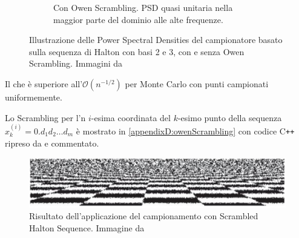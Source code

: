 \begin{figure}[tb]
\begin{subfigure}[t]{0.5\linewidth}
		\caption{Con Owen Scrambling. PSD quasi unitaria nella maggior parte del dominio alle alte frequenze.}
		\label{chapter5:sampling:owen:yes}
	\end{subfigure}
	\caption{Illustrazione delle Power Spectral Densities del campionatore basato sulla sequenza di Halton con basi 2 e 3, con e senza Owen Scrambling.
		Immagini da \cite{pharr}}
	\label{chapter5:sampling:owen}
\end{figure}
Il che \`e superiore all'$\mathcal{O}(n^{-1/2})$ per Monte Carlo con punti campionati uniformemente.\par
Lo Scrambling per l'n $i$-esima coordinata del $k$-esimo punto della sequenza $x_k^{(i)}=0.d_1d_2\ldots d_m$ \`e mostrato in 
\ref{appendixD:owenScrambling} con codice C\texttt{++} ripreso da \cite{pharr} e commentato.
\begin{figure}[b]
	\centering
	\includegraphics[width=\linewidth]{../assets/chapter5_sampling_result.png}
	\caption{Risultato dell'applicazione del campionamento con Scrambled Halton Sequence. Immagine da \cite{pharr}}
	\label{chapter5:sampling:result}
\end{figure}
